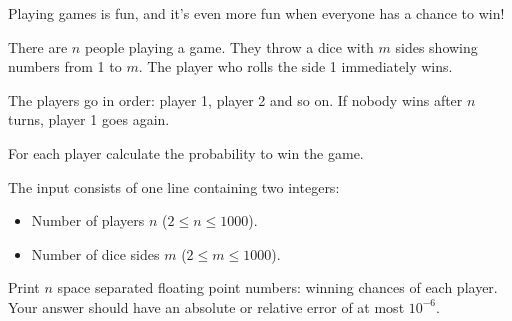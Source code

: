 \problemname{\problemyamlname}


\newcommand{\minn}{2}
\newcommand{\maxn}{1000}
\newcommand{\minm}{2}
\newcommand{\maxm}{1000}

Playing games is fun, and it's even more fun when everyone has a chance to win!

There are $n$ people playing a game. They throw a dice with $m$ sides showing numbers from 1 to $m$. The player who rolls the side 1 immediately wins.

The players go in order: player 1, player 2 and so on. If nobody wins after $n$ turns, player 1 goes again.

For each player calculate the probability to win the game.

\begin{Input}
    The input consists of one line containing two integers:
    \begin{itemize}
        \item Number of players $n$ ($\minn \leq n\leq \maxn$).
        \item Number of dice sides $m$ ($\minm \leq m\leq \maxm$).
    \end{itemize}
\end{Input}

\begin{Output}
    Print $n$ space separated floating point numbers: winning chances of each player.
    Your answer should have an absolute or relative error of at most $10^{-6}$.
\end{Output}
